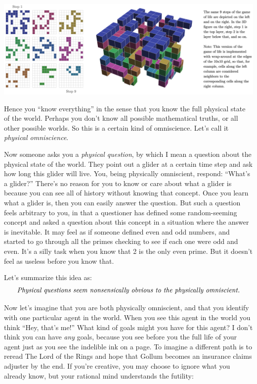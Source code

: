 \documentclass[11pt, oneside]{article}
\begin{document}
\begin{center}
\includegraphics[width=\textwidth]{gameoflife_3d.png}
\end{center}



Hence you ``know everything'' in the sense that you know the full physical state
of the world. Perhaps you don't know all possible mathematical truths, or all
other possible worlds. So this is a certain kind of omniscience. Let's call it
{\em physical omniscience}.

Now someone asks you a {\em physical question}, by which I mean
a question about the physical state of the world.
They point out a glider at a certain time step and
ask how long this glider will live. You, being physically omniscient,
respond:
``What's a glider?'' There's no reason for you to know or care about what a
glider is because you can see all of history without knowing that concept.
Once you
learn what a glider is, then you can easily answer the question. But such a
question feels arbitrary to you, in that a questioner has defined some
random-seeming concept and asked a question about this concept in a situation
where
the answer is inevitable. It may feel as if someone defined even and odd
numbers, and started to go through all the primes checking to see if each one
were odd and even. It's a silly task when you know that 2 is the only
even prime. But it doesn't feel as useless before you know that.

Let's summarize this idea as:
\begin{equation*}\label{eq1}
    \text{\em Physical questions seem nonsensically obvious to the physically
    omniscient.}
\end{equation*}

Now let's imagine that you are both physically omniscient, and that you identify
with one particular agent in the world.
When you see this agent in the world you
think ``Hey, that's me!'' What kind of goals might you have for this agent? I
don't think you can have {\em any} goals, because you see before you the
full life of your agent just as you see the indelible ink on a page. To imagine
a different path is to reread The Lord of the Rings and hope that Gollum
becomes an insurance claims adjuster by the end. If you're creative, you may
choose to ignore what you already know, but your rational mind understands the
futility:
\end{document}

